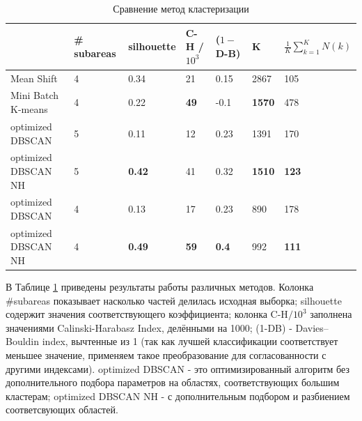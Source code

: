 \documentclass[12pt,fleqn]{article}
\begin{document}
 
 \begin{table}[h]
 \begin{center}
\begin{tabular}{|l|l|l|l|l|l|l|}
\hline
                    & \# subareas & silhouette    & C-H / $10^3$    & ($1 -$ D-B)    & K             & $\frac{1}{K}\sum_{k=1}^{K}N(k)$           \\ \hline
Mean Shift          & 4           & 0.34          & 21          & 0.15         & 2867          & 105          \\ \hline
Mini Batch K-means  & 4           & 0.22          & \textbf{49} & -0.1         & \textbf{1570} & 478          \\ \hline
optimized DBSCAN    & 5           & 0.11          & 12          & 0.23         & 1391          & 170          \\
optimized DBSCAN NH & 5           & \textbf{0.42} & 41          & 0.32         & \textbf{1510} & \textbf{123} \\ \hline
optimized DBSCAN    & 4           & 0.13          & 17          & 0.23         & 890           & 178          \\
optimized DBSCAN NH & 4           & \textbf{0.49} & \textbf{59} & \textbf{0.4} & 992           & \textbf{111} \\ \hline
\end{tabular}
\caption{Сравнение метод кластеризации}\label{all_methods}
\end{center}
\end{table}
 

 
 В Таблице \ref{all_methods} приведены результаты работы различных методов. Колонка \#subareas показывает насколько частей делилась исходная выборка; silhouette содержит значения соответствующего коэффициента; колонка C-H$/10^3$ заполнена значениями Calinski-Harabasz Index, делёнными на 1000; (1-DB) - Davies–Bouldin index, вычтенные из 1 (так как лучшей классификации соответствует меньшее значение, применяем такое преобразование для согласованности с другими индексами). optimized DBSCAN - это оптимизированный алгоритм без дополнительного подбора параметров на областях, соответствующих большим кластерам; optimized DBSCAN NH - с дополнительным подбором и разбиением соответсвующих областей.
 
\end{document}
